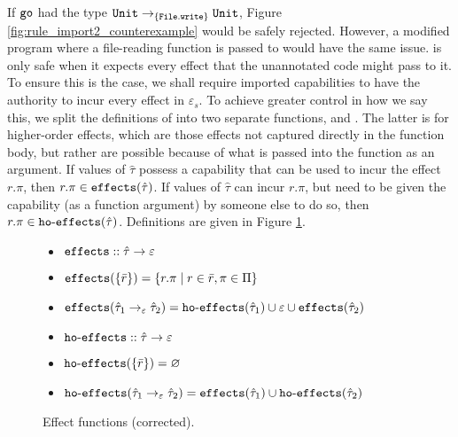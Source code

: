 If $\mathtt{go}$ had the type $\mathtt{Unit} \rightarrow_{\{ \mathtt{File.write} \}} \mathtt{Unit}$,
Figure \ref{fig:rule_import2_counterexample} would be safely rejected. However,
a modified program where a file-reading function is passed to  would have
the same issue.  is only safe when it expects every effect that the
unannotated code might pass to it. To ensure this is the case, we shall require
imported capabilities to have the authority to incur every effect in $\varepsilon_s$.
To achieve greater control in how we say this, we split the definitions of
 into two separate functions,  and
. The latter is for higher-order effects, which are those
effects not captured directly in the function body, but rather are possible because of
what is passed into the function as an argument. If values of $\hat \tau$ possess
a capability that can be used to incur the effect $r.\pi$, then $r.\pi \in \mathtt{effects}(\hat \tau)$.
If values of $\hat \tau$ can incur $r.\pi$, but need to be given the capability (as a
function argument) by someone else to do so, then $r.\pi \in \mathtt{ho \hbox{-} effects}(\hat \tau)$.
Definitions are given in Figure \ref{fig:fx_defns}.

\begin{figure}
\vspace*{-5mm}
\begin{itemize}
	\setlength\itemsep{-0.2em}
\item[] $\mathtt{effects} :: \hat \tau \rightarrow \varepsilon$
	\item[] $\mathtt{effects}(\{ \bar r \}) = \{ r.\pi \mid r \in \bar r, \pi \in \Pi \}$
	\item[] $\mathtt{effects}(\hat \tau_1 \rightarrow_{\varepsilon} \hat \tau_2) = \mathtt{ho \hbox{-} effects}(\hat \tau_1) \cup \varepsilon \cup \mathtt{effects}(\hat \tau_2)$
\end{itemize}

\begin{itemize}
	\setlength\itemsep{-0.2em}
\item[] $\mathtt{ho \hbox{-} effects} :: \hat \tau \rightarrow \varepsilon$
	\item[] $\mathtt{ho \hbox{-} effects}(\{ \bar r \}) = \varnothing$
	\item[] $\mathtt{ho \hbox{-} effects}(\hat \tau_1 \rightarrow_{\varepsilon} \hat \tau_2) = \mathtt{effects}(\hat \tau_1) \cup \mathtt{ho \hbox{-} effects}(\hat \tau_2)$
\end{itemize}
\vspace*{-5mm}
\caption{Effect functions (corrected).}
\vspace*{-5mm}
\label{fig:fx_defns}
\end{figure}

